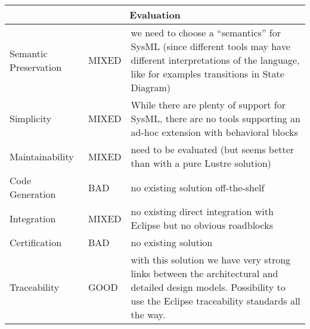 \documentclass{template/openetcs_report}
\begin{document}
\begin{tabular}[c]{|p{3.5cm}|p{1.2cm}|p{8.8cm}|}

  \hline
  \multicolumn{3}{|c|}{Evaluation} \\
  \hline

  Semantic Preservation & MIXED & we need to choose a ``semantics''
                                  for SysML (since different tools may
                                  have different interpretations of the language, like
                                  for examples transitions in State Diagram)\\

  \hline

  Simplicity &  MIXED & While there are plenty of support for SysML,
                        there are no tools supporting an ad-hoc extension
                        with behavioral blocks\\

  \hline

  Maintainability & MIXED & need to be evaluated (but seems better
                            than with a pure Lustre solution) \\

  \hline

  Code Generation & BAD &  no existing solution off-the-shelf\\

  \hline

  Integration & MIXED & no existing direct integration with Eclipse but no
                        obvious roadblocks \\

  \hline

  Certification & BAD & no existing solution\\
  
  \hline
  
  Traceability & GOOD & with this solution we  have very strong links
                        between the architectural and detailed design
                        models. Possibility to use the Eclipse
                        traceability standards all the way.\\
  
  \hline

\end{tabular}





\end{document}

